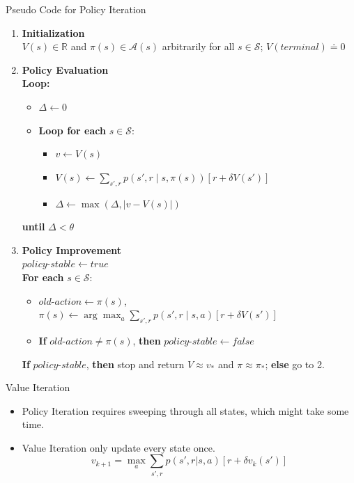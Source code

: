 \documentclass{beamer}
\begin{document}
\begin{frame}{Pseudo Code for Policy Iteration}
    \begin{enumerate}
    \item \textbf{Initialization} \\
    $V(s) \in \mathbb{R}$ and $\pi(s) \in \mathcal{A}(s)$ arbitrarily for all $s \in \mathcal{S}$; $V(terminal) \doteq 0$
    
    \item \textbf{Policy Evaluation} \\
    \textbf{Loop:}
    \begin{itemize}
        \item $\Delta \leftarrow 0$
        \item \textbf{Loop for each} $s \in \mathcal{S}$:
        \begin{itemize}
            \item $v \leftarrow V(s)$
            \item $V(s) \leftarrow \sum_{s',r} p(s',r \mid s, \pi(s)) [r + \delta V(s')]$
            \item $\Delta \leftarrow \max(\Delta, |v - V(s)|)$
        \end{itemize}
    \end{itemize}
    \textbf{until} $\Delta < \theta$ 
    
    \item \textbf{Policy Improvement} \\
    $policy\text{-}stable \leftarrow true$ \\
    \textbf{For each} $s \in \mathcal{S}$:
    \begin{itemize}
        \item $old\text{-}action \leftarrow \pi(s)$, $\pi(s) \leftarrow \arg\max_a \sum_{s',r} p(s',r \mid s, a) [r + \delta V(s')]$
        \item \textbf{If} $old\text{-}action \neq \pi(s)$, \textbf{then} $policy\text{-}stable \leftarrow false$
    \end{itemize}
    \textbf{If} $policy\text{-}stable$, \textbf{then} stop and return $V \approx v_* $ and $\pi \approx \pi_*$; \textbf{else} go to 2.
\end{enumerate}
\end{frame}

\begin{frame}{Value Iteration}
    \begin{itemize}
        \item Policy Iteration requires sweeping through all states, which might take some time.
        \item Value Iteration only update every state once.
        \[
        v_{k+1} = \max_a\sum_{s',r}p(s',r|s,a)[r+\delta v_k(s')]
        \]
    \end{itemize}
\end{frame}
\end{document}
